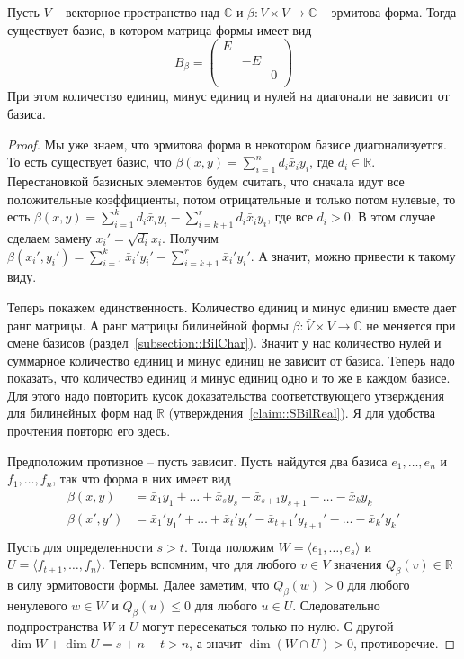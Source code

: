 \begin{claim}
Пусть $V$ -- векторное пространство над $\mathbb C$ и $\beta\colon V\times V\to\mathbb C$ -- эрмитова форма.
Тогда существует базис, в котором матрица формы имеет вид
\[
B_\beta = 
\begin{pmatrix}
{E}&{}&{}\\
{}&{-E}&{}\\
{}&{}&{0}\\
\end{pmatrix}
\]
При этом количество единиц, минус единиц и нулей на диагонали не зависит от базиса.
\end{claim}
\begin{proof}
Мы уже знаем, что эрмитова форма в некотором базисе диагонализуется.
То есть существует базис, что $\beta(x, y) = \sum_{i=1}^n d_i \bar x_i y_i$, где $d_i\in \mathbb R$.
Перестановкой базисных элементов будем считать, что сначала идут все положительные коэффициенты, потом отрицательные и только потом нулевые, то есть $\beta(x,y) = \sum_{i=1}^k d_i \bar x_i y_i - \sum_{i=k+1}^r d_i \bar x_i y_i$, где все $d_i > 0$.
В этом случае сделаем замену $x_i' = \sqrt{d_i}x_i$.
Получим $\beta(x_i',y_i') = \sum_{i=1}^k \bar x_i' y_i' - \sum_{i=k+1}^r \bar x_i' y_i'$.
А значит, можно привести к такому виду.

Теперь покажем единственность.
Количество единиц и минус единиц вместе дает ранг матрицы.
А ранг матрицы билинейной формы $\beta\colon \bar V\times V\to \mathbb C$ не меняется при смене базисов (раздел~\ref{subsection::BilChar}).
Значит у нас количество нулей и суммарное количество единиц и минус единиц не зависит от базиса.
Теперь надо показать, что количество единиц и минус единиц одно и то же в каждом базисе.
Для этого надо повторить кусок доказательства соответствующего утверждения для билинейных форм над $\mathbb R$ (утверждения~\ref{claim::SBilReal}).
Я для удобства прочтения повторю его здесь.

Предположим противное -- пусть зависит.
Пусть найдутся два базиса $e_1,\ldots,e_n$ и $f_1,\ldots,f_n$, так что форма в них имеет вид
\begin{align*}
\beta(x, y) &= \bar x_1y_1+\ldots +\bar x_s y_s - \bar x_{s+1}y_{s+1} - \ldots - \bar x_k y_k\\
\beta(x',y') &= \bar x_1'y_1'+\ldots +\bar x_t' y_t' - \bar x_{t+1}' y_{t+1}' - \ldots - \bar x_k' y_k'\\
\end{align*}
Пусть для определенности $s > t$.
Тогда положим $W = \langle e_1,\ldots, e_s\rangle$ и $U = \langle f_{t+1},\ldots, f_n\rangle$.
Теперь вспомним, что для любого $v\in V$ значения $Q_\beta(v)\in \mathbb R$ в силу эрмитовости формы.
Далее заметим, что $Q_\beta(w) > 0$ для любого ненулевого $w\in W$ и $Q_\beta(u) \leqslant 0$ для любого $u\in U$.
Следовательно подпространства $W$ и $U$ могут пересекаться только по нулю.
С другой $\dim W+\dim U = s + n - t > n$, а значит $\dim(W\cap U) > 0$, противоречие.
\end{proof}

